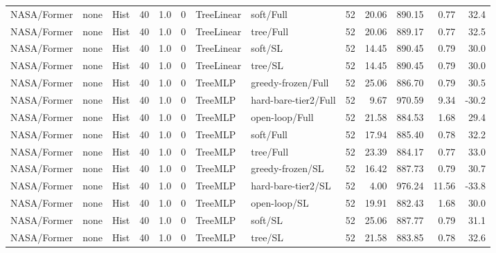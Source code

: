 \documentclass[10pt,a4paper]{article}
\begin{document}
\begin{landscape}
\begin{longtable}{llllllllrrrrr}
NASA/Former & none & Hist & 40 & 1.0 & 0 & TreeLinear & soft/Full & 52 & 20.06 & 890.15 & 0.77 & 32.4 \\

NASA/Former & none & Hist & 40 & 1.0 & 0 & TreeLinear & tree/Full & 52 & 20.06 & 889.17 & 0.77 & 32.5 \\

NASA/Former & none & Hist & 40 & 1.0 & 0 & TreeLinear & soft/SL & 52 & 14.45 & 890.45 & 0.79 & 30.0 \\

NASA/Former & none & Hist & 40 & 1.0 & 0 & TreeLinear & tree/SL & 52 & 14.45 & 890.45 & 0.79 & 30.0 \\

NASA/Former & none & Hist & 40 & 1.0 & 0 & TreeMLP & greedy-frozen/Full & 52 & 25.06 & 886.70 & 0.79 & 30.5 \\

NASA/Former & none & Hist & 40 & 1.0 & 0 & TreeMLP & hard-bare-tier2/Full & 52 & 9.67 & 970.59 & 9.34 & -30.2 \\

NASA/Former & none & Hist & 40 & 1.0 & 0 & TreeMLP & open-loop/Full & 52 & 21.58 & 884.53 & 1.68 & 29.4 \\

NASA/Former & none & Hist & 40 & 1.0 & 0 & TreeMLP & soft/Full & 52 & 17.94 & 885.40 & 0.78 & 32.2 \\

NASA/Former & none & Hist & 40 & 1.0 & 0 & TreeMLP & tree/Full & 52 & 23.39 & 884.17 & 0.77 & 33.0 \\

NASA/Former & none & Hist & 40 & 1.0 & 0 & TreeMLP & greedy-frozen/SL & 52 & 16.42 & 887.73 & 0.79 & 30.7 \\

NASA/Former & none & Hist & 40 & 1.0 & 0 & TreeMLP & hard-bare-tier2/SL & 52 & 4.00 & 976.24 & 11.56 & -33.8 \\

NASA/Former & none & Hist & 40 & 1.0 & 0 & TreeMLP & open-loop/SL & 52 & 19.91 & 882.43 & 1.68 & 30.0 \\

NASA/Former & none & Hist & 40 & 1.0 & 0 & TreeMLP & soft/SL & 52 & 25.06 & 887.77 & 0.79 & 31.1 \\

NASA/Former & none & Hist & 40 & 1.0 & 0 & TreeMLP & tree/SL & 52 & 21.58 & 883.85 & 0.78 & 32.6 \\


\end{longtable}
\end{landscape}
\end{document}
